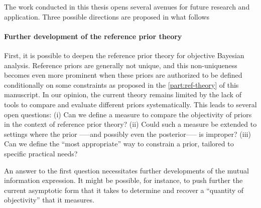 















The work conducted in this thesis opens several avenues for future research and application. Three possible directions are proposed in what follows %



\paragraph{Further development of the reference prior theory}

First, it is possible to deepen the reference prior theory for objective Bayesian analysis. Reference priors are generally not unique, and this non-uniqueness becomes even more prominent when these priors are authorized to be defined conditionally on some constraints as proposed in the \cref{part:ref-theory} of this manuscript. In our opinion, the current theory remains limited by the lack of tools to compare and evaluate different priors systematically. This leads to several open questions:
(i) Can we define a measure to compare the objectivity of priors in the context of reference prior theory? (ii)
Could such a measure be extended to settings where the prior —--and possibly even the posterior—-- is improper? (iii) Can we define the ``most appropriate'' way to constrain a prior, tailored to specific practical needs?

An answer to the first question necessitates further developments of the mutual information expression.
It might be possible, for instance, to push further the current asymptotic form that it takes to determine and
recover a ``quantity of objectivity'' that it measures.

